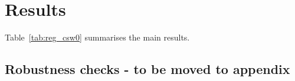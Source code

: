 
\section{Results}%
\label{sec:results}

Table~\ref{tab:reg_csw0} summarises the main results.

\begin{landscape}
    
\end{landscape}




\subsection{Robustness checks - to be moved to appendix}%
\label{sub:robustness_checks_to_be_moved_to_appendix}

\begin{landscape}
    
\end{landscape}

